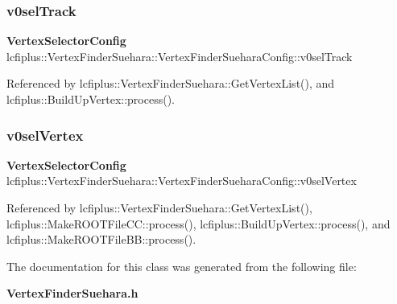 \subsubsection{v0sel\+Track}
{\footnotesize\ttfamily \textbf{ Vertex\+Selector\+Config} lcfiplus\+::\+Vertex\+Finder\+Suehara\+::\+Vertex\+Finder\+Suehara\+Config\+::v0sel\+Track}



Referenced by lcfiplus\+::\+Vertex\+Finder\+Suehara\+::\+Get\+Vertex\+List(), and lcfiplus\+::\+Build\+Up\+Vertex\+::process().

\mbox{\label{classlcfiplus_1_1VertexFinderSuehara_1_1VertexFinderSueharaConfig_a9f39e4759afdd0ff20cf81746c854918}} 
\subsubsection{v0sel\+Vertex}
{\footnotesize\ttfamily \textbf{ Vertex\+Selector\+Config} lcfiplus\+::\+Vertex\+Finder\+Suehara\+::\+Vertex\+Finder\+Suehara\+Config\+::v0sel\+Vertex}



Referenced by lcfiplus\+::\+Vertex\+Finder\+Suehara\+::\+Get\+Vertex\+List(), lcfiplus\+::\+Make\+R\+O\+O\+T\+File\+C\+C\+::process(), lcfiplus\+::\+Build\+Up\+Vertex\+::process(), and lcfiplus\+::\+Make\+R\+O\+O\+T\+File\+B\+B\+::process().



The documentation for this class was generated from the following file\+:\begin{DoxyCompactItemize}
\item 
\textbf{ Vertex\+Finder\+Suehara.\+h}\end{DoxyCompactItemize}
